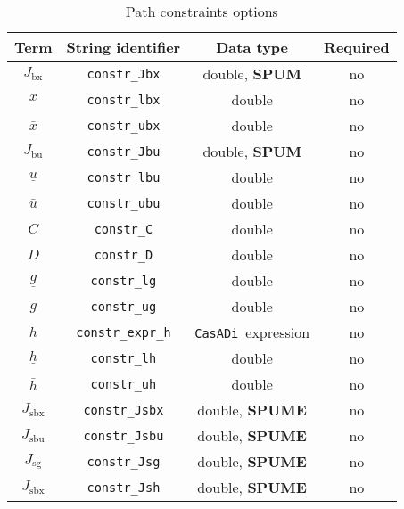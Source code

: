 \documentclass[english]{article}
\newcommand{\code}[1]{\texttt{#1}}
\newcommand{\casadi}{\texttt{CasADi}}
\newcommand{\ind}[1]{_{\textrm{#1}}}
\newcommand{\optional}{no}
\begin{document}
\begin{table}[h!]
    \centering
    \caption{Path constraints options} \label{tab:constraints:path}
    \begin{tabular}{cccc}
        \toprule
        Term & String identifier & Data type & Required \\ \midrule
        $J\ind{bx}$ & \code{constr\_Jbx}    & double, \textbf{SPUM} & \optional  \\
        $\underline{x} $    & \code{constr\_lbx}     & double  & \optional  \\
        $\bar{x} $  & \code{constr\_ubx}     & double  & \optional   \\ [1em]
        $J\ind{bu}$ & \code{constr\_Jbu}    & double, \textbf{SPUM}   & \optional    \\
        $\underline{u} $    & \code{constr\_lbu}     & double   & \optional   \\
        $\bar{u} $         & \code{constr\_ubu}     & double  & \optional   \\ [1em]
        $C$ & \code{constr\_C}    & double  & \optional \\
        $D $    & \code{constr\_D}     & double  & \optional \\
        $\underline{g} $    & \code{constr\_lg}     & double  & \optional    \\
        $\bar{g} $         & \code{constr\_ug}     & double  & \optional   \\ [1em]
        $ h $ & \code{constr\_expr\_h}    & \casadi~expression  & \optional   \\
        $\underline{h} $    & \code{constr\_lh}     & double   & \optional   \\
        $\bar{h} $         & \code{constr\_uh}     & double  & \optional   \\ [1em]
        $ J\ind{sbx} $ & \code{constr\_Jsbx} & double, \textbf{SPUME} & \optional  \\
        $ J\ind{sbu} $ & \code{constr\_Jsbu} & double, \textbf{SPUME}  & \optional \\
        $ J\ind{sg} $ & \code{constr\_Jsg} & double, \textbf{SPUME} & \optional  \\
        $ J\ind{sbx} $ & \code{constr\_Jsh} & double, \textbf{SPUME}  & \optional  \\
        \bottomrule
    \end{tabular}
\end{table}
%
\end{document}
